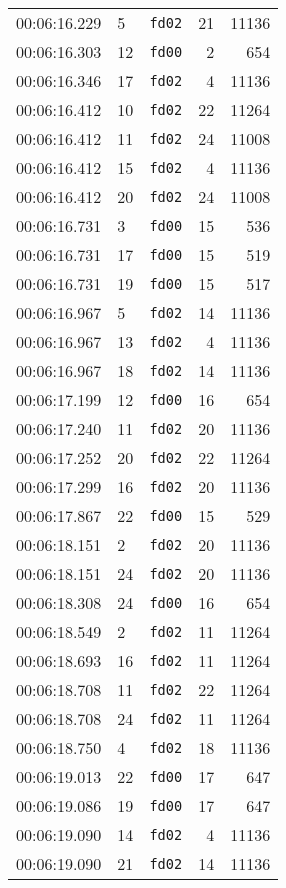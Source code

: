 \documentclass{article}
\begin{document}
\begin{longtable}{lllrr}
00:06:16.229 & 5 & \texttt{fd02} & 21 & 11136 \\
00:06:16.303 & 12 & \texttt{fd00} & 2 & 654 \\
00:06:16.346 & 17 & \texttt{fd02} & 4 & 11136 \\
00:06:16.412 & 10 & \texttt{fd02} & 22 & 11264 \\
00:06:16.412 & 11 & \texttt{fd02} & 24 & 11008 \\
00:06:16.412 & 15 & \texttt{fd02} & 4 & 11136 \\
00:06:16.412 & 20 & \texttt{fd02} & 24 & 11008 \\
00:06:16.731 & 3 & \texttt{fd00} & 15 & 536 \\
00:06:16.731 & 17 & \texttt{fd00} & 15 & 519 \\
00:06:16.731 & 19 & \texttt{fd00} & 15 & 517 \\
00:06:16.967 & 5 & \texttt{fd02} & 14 & 11136 \\
00:06:16.967 & 13 & \texttt{fd02} & 4 & 11136 \\
00:06:16.967 & 18 & \texttt{fd02} & 14 & 11136 \\
00:06:17.199 & 12 & \texttt{fd00} & 16 & 654 \\
00:06:17.240 & 11 & \texttt{fd02} & 20 & 11136 \\
00:06:17.252 & 20 & \texttt{fd02} & 22 & 11264 \\
00:06:17.299 & 16 & \texttt{fd02} & 20 & 11136 \\
00:06:17.867 & 22 & \texttt{fd00} & 15 & 529 \\
00:06:18.151 & 2 & \texttt{fd02} & 20 & 11136 \\
00:06:18.151 & 24 & \texttt{fd02} & 20 & 11136 \\
00:06:18.308 & 24 & \texttt{fd00} & 16 & 654 \\
00:06:18.549 & 2 & \texttt{fd02} & 11 & 11264 \\
00:06:18.693 & 16 & \texttt{fd02} & 11 & 11264 \\
00:06:18.708 & 11 & \texttt{fd02} & 22 & 11264 \\
00:06:18.708 & 24 & \texttt{fd02} & 11 & 11264 \\
00:06:18.750 & 4 & \texttt{fd02} & 18 & 11136 \\
00:06:19.013 & 22 & \texttt{fd00} & 17 & 647 \\
00:06:19.086 & 19 & \texttt{fd00} & 17 & 647 \\
00:06:19.090 & 14 & \texttt{fd02} & 4 & 11136 \\
00:06:19.090 & 21 & \texttt{fd02} & 14 & 11136 \\

\end{longtable}
\end{document}
